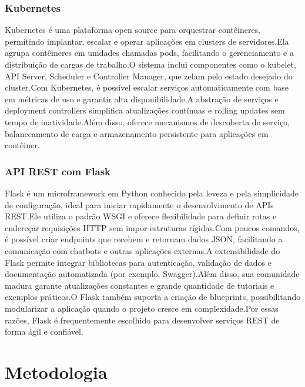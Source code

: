 \begin{description}
\subsection{Kubernetes}
Kubernetes é uma plataforma open source para orquestrar contêineres, permitindo implantar, escalar e operar aplicações em clusters de servidores.Ela agrupa contêineres em unidades chamadas pods, facilitando o gerenciamento e a distribuição de cargas de trabalho.O sistema inclui componentes como o kubelet, API Server, Scheduler e Controller Manager, que zelam pelo estado desejado do cluster.Com Kubernetes, é possível escalar serviços automaticamente com base em métricas de uso e garantir alta disponibilidade.A abstração de serviços e deployment controllers simplifica atualizações contínuas e rolling updates sem tempo de inatividade.Além disso, oferece mecanismos de descoberta de serviço, balanceamento de carga e armazenamento persistente para aplicações em contêiner.\cite{kubernetes2025overview}

\subsection{API REST com Flask}
Flask é um microframework em Python conhecido pela leveza e pela simplicidade de configuração, ideal para iniciar rapidamente o desenvolvimento de APIs REST.Ele utiliza o padrão WSGI e oferece flexibilidade para definir rotas e endereçar requisições HTTP sem impor estruturas rígidas.Com poucos comandos, é possível criar endpoints que recebem e retornam dados JSON, facilitando a comunicação com chatbots e outras aplicações externas.A extensibilidade do Flask permite integrar bibliotecas para autenticação, validação de dados e documentação automatizada (por exemplo, Swagger).Além disso, sua comunidade madura garante atualizações constantes e grande quantidade de tutoriais e exemplos práticos.O Flask também suporta a criação de blueprints, possibilitando modularizar a aplicação quando o projeto cresce em complexidade.Por essas razões, Flask é frequentemente escolhido para desenvolver serviços REST de forma ágil e confiável\cite{flask2024}.



\chapter{Metodologia}
\label{chap:metodologia}


\end{description}
